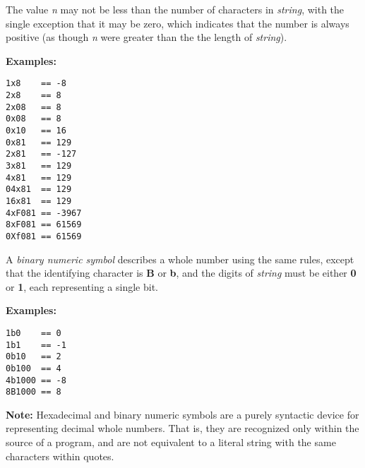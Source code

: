The value \emph{n} may not be less than the number of characters in
\emph{string}, with the single exception that it may be zero, which
indicates that the number is always positive (as though \emph{n}
were greater than the the length of \emph{string}).
 
\textbf{Examples:}
\begin{lstlisting}
1x8    == -8
2x8    == 8
2x08   == 8
0x08   == 8
0x10   == 16
0x81   == 129
2x81   == -127
3x81   == 129
4x81   == 129
04x81  == 129
16x81  == 129
4xF081 == -3967
8xF081 == 61569
0Xf081 == 61569
\end{lstlisting}
 
A \emph{binary numeric symbol} describes a whole number using the
same rules, except that the identifying character is \textbf{B}
or \textbf{b}, and the digits of \emph{string} must be
either \textbf{0} or \textbf{1}, each representing a single bit.
 
\textbf{Examples:}
\begin{lstlisting}
1b0    == 0
1b1    == -1
0b10   == 2
0b100  == 4
4b1000 == -8
8B1000 == 8
\end{lstlisting}
\textbf{Note: }Hexadecimal and binary numeric symbols are a purely syntactic
device for representing decimal whole numbers.  That is, they are
recognized only within the source of a \nr{} program, and are not
equivalent to a literal string with the same characters within quotes.
